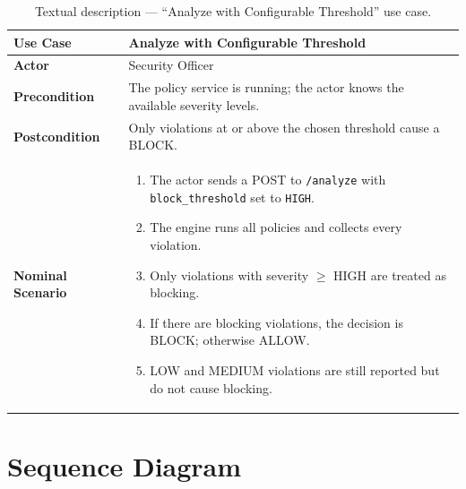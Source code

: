 \begin{table}[H]
\centering
\begin{tabularx}{\textwidth}{|l|X|}
\hline
\textbf{Use Case} & Analyze with Configurable Threshold \\
\hline
\textbf{Actor} & Security Officer \\
\hline
\textbf{Precondition} & The policy service is running; the actor knows the available severity levels. \\
\hline
\textbf{Postcondition} & Only violations at or above the chosen threshold cause a BLOCK. \\
\hline
\textbf{Nominal Scenario} &
  \begin{enumerate}[leftmargin=0.8cm, nosep]
    \item The actor sends a POST to \texttt{/analyze} with \texttt{block\_threshold} set to \texttt{HIGH}.
    \item The engine runs all policies and collects every violation.
    \item Only violations with severity $\geq$ HIGH are treated as blocking.
    \item If there are blocking violations, the decision is BLOCK; otherwise ALLOW.
    \item LOW and MEDIUM violations are still reported but do not cause blocking.
  \end{enumerate} \\
\hline
\end{tabularx}
\caption{Textual description --- ``Analyze with Configurable Threshold'' use case.}
\label{tab:uc-threshold}
\end{table}


\section{Sequence Diagram}

